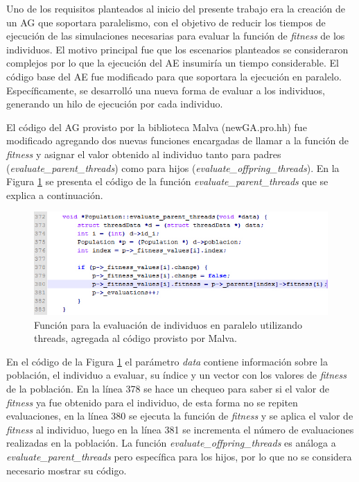 Uno de los requisitos planteados al inicio del presente trabajo era la creación de un AG que soportara paralelismo, con el objetivo de reducir los tiempos de ejecución de las simulaciones necesarias para evaluar la función de \emph{fitness} de los individuos. El motivo principal fue que los escenarios planteados se consideraron complejos por lo que la ejecución del AE insumiría un tiempo considerable. El código base del AE fue modificado para que soportara la ejecución en paralelo. Específicamente, se desarrolló una nueva forma de evaluar a los individuos, generando un hilo de ejecución por cada individuo.

El código del AG provisto por la biblioteca Malva (newGA.pro.hh) fue modificado agregando dos nuevas funciones encargadas de llamar a la función de \emph{fitness} y asignar el valor obtenido al individuo tanto para padres (\emph{evaluate{\_}parent{\_}threads}) como para hijos (\emph{evaluate{\_}offpring{\_}threads}). En la Figura \ref{fig:codigo1} se presenta el código de la función \emph{evaluate{\_}parent{\_}threads} que se explica a continuación. 

\begin{figure}[H]
	\centering
	\includegraphics[width=0.99\linewidth]{Figures/codigo1}
	\caption{Función para la evaluación de individuos en paralelo utilizando threads, agregada al código provisto por Malva.}
	\label{fig:codigo1}
\end{figure}

En el código de la Figura \ref{fig:codigo1} el parámetro \emph{data} contiene información sobre la población, el individuo a evaluar, su índice y un vector con los valores de \emph{fitness} de la población. En la línea 378 se hace un chequeo para saber si el valor de \emph{fitness} ya fue obtenido para el individuo, de esta forma no se repiten evaluaciones, en la línea 380 se ejecuta la función de \emph{fitness} y se aplica el valor de \emph{fitness} al individuo, luego en la línea 381 se incrementa el número de evaluaciones realizadas en la población.
La función \emph{evaluate{\_}offpring{\_}threads} es análoga a \emph{evaluate{\_}parent{\_}threads} pero específica para los hijos, por lo que no se considera necesario mostrar su código.
	
